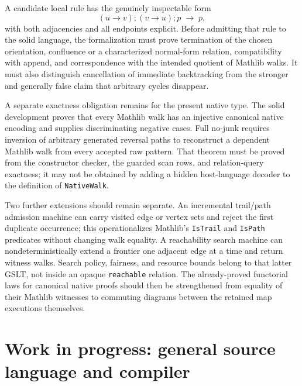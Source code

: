 \documentclass[11pt]{article}
\theoremstyle{remark}
\newcommand{\code}[1]{\texttt{#1}}
\begin{document}
A candidate local rule has the genuinely inspectable form
\[
  (u\!\to\!v);(v\!\to\!u);p \;\longrightarrow\; p,
\]
with both adjacencies and all endpoints explicit.  Before admitting that rule
to the solid language, the formalization must prove termination of the chosen
orientation, confluence or a characterized normal-form relation, compatibility
with append, and correspondence with the intended quotient of Mathlib walks.
It must also distinguish cancellation of immediate backtracking from the
stronger and generally false claim that arbitrary cycles disappear.

A separate exactness obligation remains for the present native type.  The
solid development proves that every Mathlib walk has an injective canonical
native encoding and supplies discriminating negative cases.  Full no-junk
requires inversion of arbitrary generated reversal paths to reconstruct a
dependent Mathlib walk from every accepted raw pattern.  That theorem must be
proved from the constructor checker, the guarded scan rows, and relation-query
exactness; it may not be obtained by adding a hidden host-language decoder to
the definition of \code{NativeWalk}.

Two further extensions should remain separate.  An incremental trail/path
admission machine can carry visited edge or vertex sets and reject the first
duplicate occurrence; this operationalizes Mathlib's \code{IsTrail} and
\code{IsPath} predicates without changing walk equality.  A reachability
search machine can nondeterministically extend a frontier one adjacent edge at
a time and return witness walks.  Search policy, fairness, and resource bounds
belong to that latter GSLT, not inside an opaque \code{reachable} relation.
The already-proved functorial laws for canonical native proofs should then be
strengthened from equality of their Mathlib witnesses to commuting diagrams
between the retained map executions themselves.

\section{Work in progress: general source language and compiler}
\label{app:frontend}
\end{document}
